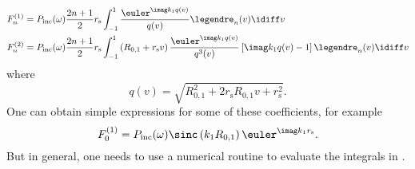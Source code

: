 \begin{align}\label{Eq1:coeffsG}
\begin{split}
	F_n^{(1)} &= P_{\mathrm{inc}}(\omega)\frac{2n+1}{2}r_{\mathrm{s}}\int_{-1}^1 \frac{\euler^{\imag k_1 q(v)}}{q(v)}\legendre_n(v)\idiff v\\
	F_n^{(2)} &= P_{\mathrm{inc}}(\omega)\frac{2n+1}{2}r_{\mathrm{s}}\int_{-1}^1 \left(R_{0,1}+r_{\mathrm{s}}v\right)\frac{\euler^{\imag k_1 q(v)}}{q^3(v)}\left[\imag k_1 q(v) - 1\right]\legendre_n(v)\idiff v
	\end{split}
\end{align}
where
\begin{equation*}
	q(v) = \sqrt{R_{0,1}^2+2r_{\mathrm{s}}R_{0,1}v+r_{\mathrm{s}}^2}.
\end{equation*}
One can obtain simple expressions for some of these coefficients, for example
\begin{equation*}
	F_0^{(1)} = P_{\mathrm{inc}}(\omega)\sinc\left(k_1R_{0,1}\right)\euler^{\imag k_1 r_{\mathrm{s}}}.
\end{equation*}
But in general, one needs to use a numerical routine to evaluate the integrals in .